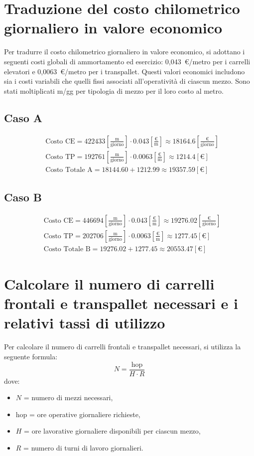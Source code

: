 \documentclass[a4paper,12pt]{article}
\begin{document}
\section{Traduzione del costo chilometrico giornaliero in valore economico}
Per tradurre il costo chilometrico giornaliero in valore economico, si adottano i seguenti costi globali di ammortamento ed esercizio: 0{,}043~€/metro per i carrelli elevatori e 0{,}0063~€/metro per i transpallet. Questi valori economici includono sia i costi variabili che quelli fissi associati all’operatività di ciascun mezzo.
Sono stati moltiplicati m/gg per tipologia di mezzo per il loro costo al metro. 
\subsection{Caso A}
\begin{align*}
  &\text{Costo CE} = 422433 \left[\frac{\mathrm{m}}{\mathrm{giorno}}\right] \cdot 0.043 \left[\frac{\text{€}}{\text{m}}\right] \approx 18164.6 \left[\frac{\text{€}}{\mathrm{giorno}}\right] \\
  &\text{Costo TP} = 192761 \left[\frac{\mathrm{m}}{\mathrm{giorno}}\right] \cdot 0.0063 \left[\frac{\text{€}}{\mathrm{m}}\right] \approx 1214.4 \left[\text{€}\right] \\
  &\text{Costo Totale A} = 18144.60 + 1212.99 \approx 19357.59 \left[\text{€}\right]
\end{align*}
\subsection{Caso B}
\begin{align*}
  &\text{Costo CE} = 446694 \left[\frac{\mathrm{m}}{\mathrm{giorno}}\right] \cdot 0.043 \left[\frac{\text{€}}{\text{m}}\right] \approx 19276.02 \left[\frac{\text{€}}{\mathrm{giorno}}\right] \\
  &\text{Costo TP} = 202706 \left[\frac{\mathrm{m}}{\mathrm{giorno}}\right] \cdot 0.0063 \left[\frac{\text{€}}{\text{m}}\right] \approx 1277.45 \left[\text{€}\right] \\
  &\text{Costo Totale B} = 19276.02 + 1277.45 \approx 20553.47 \left[\text{€}\right]
\end{align*}
\section{     Calcolare il numero di carrelli frontali e transpallet necessari e i relativi tassi di utilizzo}
Per calcolare il numero di carrelli frontali e transpallet necessari, si utilizza la seguente formula:
\begin{equation*}
  N = \frac{\text{hop}}{H \cdot R}
\end{equation*}
dove:
\begin{itemize}
  \item $N$ = numero di mezzi necessari,
  \item $\text{hop}$ = ore operative giornaliere richieste,
  \item $H$ = ore lavorative giornaliere disponibili per ciascun mezzo,
  \item $R$ = numero di turni di lavoro giornalieri.
\end{itemize}
\end{document}
